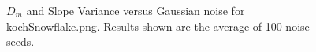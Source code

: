 \documentclass[12pt, oneside]{book}
\begin{document}
\begin{figure}[!b]
  \centering
  \caption[\(D_{m}\) and Slope Variance versus Gaussian noise for kochSnowflake.png]{\(D_{m}\) and Slope Variance versus Gaussian noise for kochSnowflake.png.  Results shown are the average of 100 noise seeds.}
  \label{fig:kochSnowflake_gaussian_result}
\end{figure}
\end{document}
